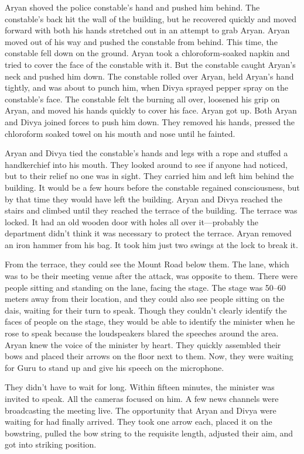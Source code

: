 Aryan shoved the police constable's hand and pushed him behind. The constable's
back hit the wall of the building, but he recovered quickly and moved forward
with both his hands stretched out in an attempt to grab Aryan. Aryan moved out
of his way and pushed the constable from behind. This time, the constable fell
down on the ground. Aryan took a chloroform-soaked napkin and tried to cover the
face of the constable with it. But the constable caught Aryan's neck and pushed
him down.  The constable rolled over Aryan, held Aryan's hand tightly, and was
about to punch him, when Divya sprayed pepper spray on the constable's face. The
constable felt the burning all over, loosened his grip on Aryan, and moved his
hands quickly to cover his face. Aryan got up. Both Aryan and Divya joined
forces to push him down. They removed his hands, pressed the chloroform soaked
towel on his mouth and nose until he fainted.

Aryan and Divya tied the constable's hands and legs with a rope and stuffed a
handkerchief into his mouth. They looked around to see if anyone had noticed, but
to their relief no one was in sight. They carried him and left him behind 
the building. It would be a few hours before the constable regained consciousness,
but by that time they would have left the building. Aryan and Divya reached the
stairs and climbed until they reached the terrace of the building. The terrace
was locked. It had an old wooden door with holes all over it—probably the
department didn't think it was necessary to protect the terrace. Aryan removed
an iron hammer from his bag. It took him just two swings at the lock to break
it.

From the terrace, they could see the Mount Road below them. The lane, which was
to be their meeting venue after the attack, was opposite to them. There were
people sitting and standing on the lane, facing the stage. The stage was 50–60
meters away from their location, and they could also see people sitting on the dais,
waiting for their turn to speak. Though they couldn't clearly identify the faces of
people on the stage, they would be able to identify the minister when he
rose to speak because the loudspeakers blared the speeches around the area.
Aryan knew the voice of the minister by heart. They quickly assembled their bows
and placed their arrows on the floor next to them. Now, they were waiting for
Guru to stand up and give his speech on the microphone.

They didn't have to wait for long. Within fifteen minutes, the minister was invited to
speak. All the cameras focused on him. A few news channels were broadcasting the
meeting live. The opportunity that Aryan and Divya were waiting for had finally
arrived. They took one arrow each, placed it on the bowstring, pulled the bow
string to the requisite length, adjusted their aim, and got into striking
position.

